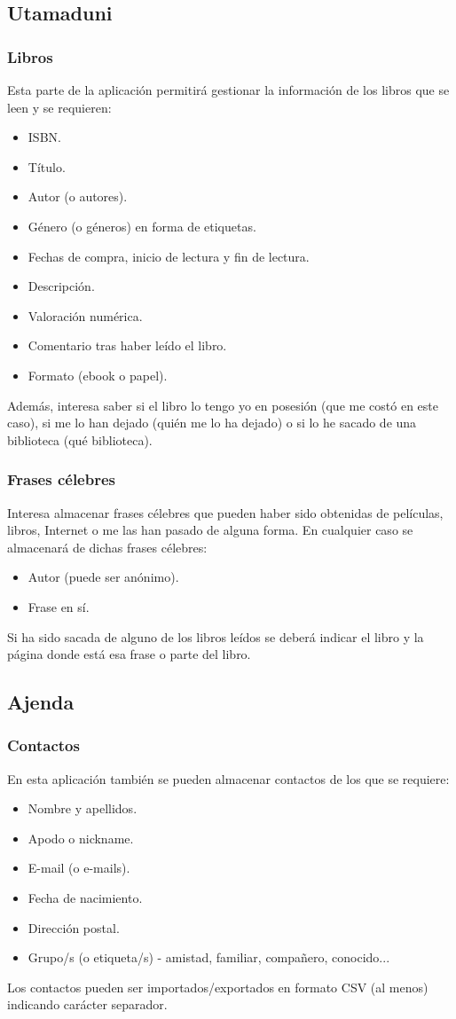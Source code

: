 \documentclass[12pt,twoside,a4paper]{article}
\begin{document}
\subsection{Utamaduni}
\subsubsection{Libros}
Esta parte de la aplicación permitirá gestionar la información de los libros que se leen y se requieren:
\begin{itemize}
\item ISBN.
\item Título.
\item Autor (o autores).
\item Género (o géneros) en forma de etiquetas.
\item Fechas de compra, inicio de lectura y fin de lectura.
\item Descripción.
\item Valoración numérica.
\item Comentario tras haber leído el libro.
\item Formato (ebook o papel).
\end{itemize}
Además, interesa saber si el libro lo tengo yo en posesión (que me costó en este caso), si me lo han dejado (quién me lo ha dejado) o si lo he sacado de una biblioteca (qué biblioteca).

\subsubsection{Frases célebres}
Interesa almacenar frases célebres que pueden haber sido obtenidas de películas, libros, Internet o me las han pasado de alguna forma. En cualquier caso se almacenará de dichas frases célebres:
\begin{itemize}
\item Autor (puede ser anónimo).
\item Frase en sí.
\end{itemize}
Si ha sido sacada de alguno de los libros leídos se deberá indicar el libro y la página donde está esa frase o parte del libro.

\subsection{Ajenda}
\subsubsection{Contactos}
En esta aplicación también se pueden almacenar contactos de los que se requiere:
\begin{itemize}
\item Nombre y apellidos.
\item Apodo o nickname.
\item E-mail (o e-mails).
\item Fecha de nacimiento.
\item Dirección postal.
\item Grupo/s (o etiqueta/s) - amistad, familiar, compañero, conocido...
\end{itemize}
Los contactos pueden ser importados/exportados en formato CSV (al menos) indicando carácter separador.
\end{document}
